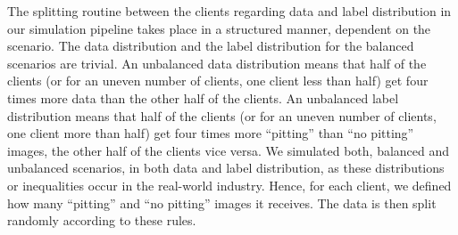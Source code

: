 The splitting routine between the clients regarding data and label distribution in our simulation pipeline takes place in a structured manner, dependent on the scenario. The data distribution and the label distribution for the balanced scenarios are trivial. An unbalanced data distribution means that half of the clients (or for an uneven number of clients, one client less than half) get four times more data than the other half of the clients. An unbalanced label distribution means that half of the clients (or for an uneven number of clients, one client more than half) get four times more ``pitting'' than ``no pitting'' images, the other half of the clients vice versa. We simulated both, balanced and unbalanced scenarios, in both data and label distribution, as these distributions or inequalities occur in the real-world industry. Hence, for each client, we defined how many ``pitting'' and ``no pitting'' images it receives. The data is then split randomly according to these rules.
